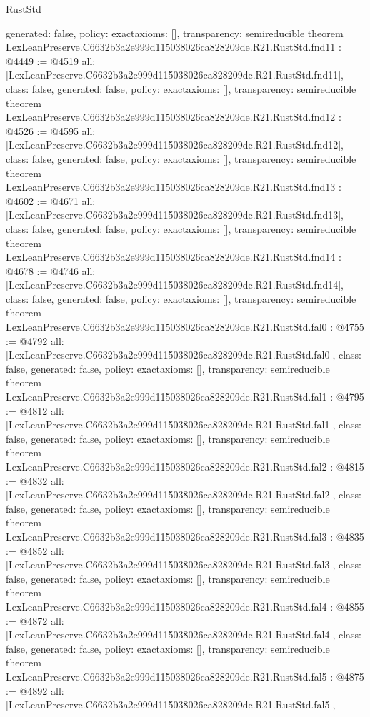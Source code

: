 \begin{lexlean}{RustStd}
\begin{coremodule}
{  generated: false,
  policy: exact{axioms: []},
  transparency: semireducible
}
theorem LexLeanPreserve.C6632b3a2e999d115038026ca828209de.R21.RustStd.fnd11 : @4449 := @4519 {
  all: [LexLeanPreserve.C6632b3a2e999d115038026ca828209de.R21.RustStd.fnd11],
  class: false,
  generated: false,
  policy: exact{axioms: []},
  transparency: semireducible
}
theorem LexLeanPreserve.C6632b3a2e999d115038026ca828209de.R21.RustStd.fnd12 : @4526 := @4595 {
  all: [LexLeanPreserve.C6632b3a2e999d115038026ca828209de.R21.RustStd.fnd12],
  class: false,
  generated: false,
  policy: exact{axioms: []},
  transparency: semireducible
}
theorem LexLeanPreserve.C6632b3a2e999d115038026ca828209de.R21.RustStd.fnd13 : @4602 := @4671 {
  all: [LexLeanPreserve.C6632b3a2e999d115038026ca828209de.R21.RustStd.fnd13],
  class: false,
  generated: false,
  policy: exact{axioms: []},
  transparency: semireducible
}
theorem LexLeanPreserve.C6632b3a2e999d115038026ca828209de.R21.RustStd.fnd14 : @4678 := @4746 {
  all: [LexLeanPreserve.C6632b3a2e999d115038026ca828209de.R21.RustStd.fnd14],
  class: false,
  generated: false,
  policy: exact{axioms: []},
  transparency: semireducible
}
theorem LexLeanPreserve.C6632b3a2e999d115038026ca828209de.R21.RustStd.fal0 : @4755 := @4792 {
  all: [LexLeanPreserve.C6632b3a2e999d115038026ca828209de.R21.RustStd.fal0],
  class: false,
  generated: false,
  policy: exact{axioms: []},
  transparency: semireducible
}
theorem LexLeanPreserve.C6632b3a2e999d115038026ca828209de.R21.RustStd.fal1 : @4795 := @4812 {
  all: [LexLeanPreserve.C6632b3a2e999d115038026ca828209de.R21.RustStd.fal1],
  class: false,
  generated: false,
  policy: exact{axioms: []},
  transparency: semireducible
}
theorem LexLeanPreserve.C6632b3a2e999d115038026ca828209de.R21.RustStd.fal2 : @4815 := @4832 {
  all: [LexLeanPreserve.C6632b3a2e999d115038026ca828209de.R21.RustStd.fal2],
  class: false,
  generated: false,
  policy: exact{axioms: []},
  transparency: semireducible
}
theorem LexLeanPreserve.C6632b3a2e999d115038026ca828209de.R21.RustStd.fal3 : @4835 := @4852 {
  all: [LexLeanPreserve.C6632b3a2e999d115038026ca828209de.R21.RustStd.fal3],
  class: false,
  generated: false,
  policy: exact{axioms: []},
  transparency: semireducible
}
theorem LexLeanPreserve.C6632b3a2e999d115038026ca828209de.R21.RustStd.fal4 : @4855 := @4872 {
  all: [LexLeanPreserve.C6632b3a2e999d115038026ca828209de.R21.RustStd.fal4],
  class: false,
  generated: false,
  policy: exact{axioms: []},
  transparency: semireducible
}
theorem LexLeanPreserve.C6632b3a2e999d115038026ca828209de.R21.RustStd.fal5 : @4875 := @4892 {
  all: [LexLeanPreserve.C6632b3a2e999d115038026ca828209de.R21.RustStd.fal5],
}
\end{coremodule}
\end{lexlean}
